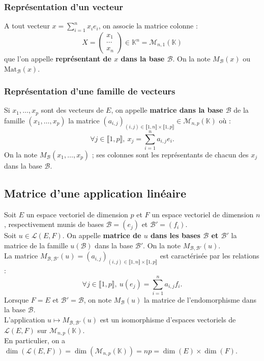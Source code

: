 \documentclass[french]{article}
\newcommand{\K}{\mathbb{K}}
\theoremstyle{plain}
\theoremstyle{definition}
\theoremstyle{remark}
\begin{document}
\subsubsection*{Représentation d'un vecteur}

A tout vecteur $x=\displaystyle\sum_{i=1}^n x_ie_i$, on associe la matrice colonne :
$$X=\begin{pmatrix}
	x_1\\
	\cdots\\
	x_n
\end{pmatrix}\in\K^n=\mathcal{M}_{n,1}(\K)$$ que l'on appelle \textbf{représentant de $x$ dans la base $\mathcal{B}$}. On la note $M_\mathcal{B}(x)$ ou $\text{Mat}_\mathcal{B}(x)$.

\subsubsection*{Représentation d'une famille de vecteurs}

Si $x_1,\ldots,x_p$ sont des vecteurs de $E$, on appelle \textbf{matrice dans la base $\mathcal{B}$} de la famille $(x_1,\ldots,x_p)$ la matrice $(a_{i,j})_{(i,j)\in\llbracket1,n\rrbracket\times\llbracket1,p\rrbracket}\in\mathcal{M}_{n,p}(\K)$ où :
$$\forall j\in\llbracket1,p\rrbracket,\ x_j=\sum_{i=1}^{n}a_{i,j}e_i.$$
On la note $M_\mathcal{B}(x_1,\ldots,x_p)$ ; ses colonnes sont les représentants de chacun des $x_j$ dans la base $\mathcal{B}$.

\subsection{Matrice d'une application linéaire}

Soit $E$ un espace vectoriel de dimension $p$ et $F$ un espace vectoriel de dimension $n$, respectivement munis de bases $\mathcal{B}=(e_j)$ et $\mathcal{B}'=(f_i)$.\\
Soit $u\in\mathcal{L}(E,F)$. On appelle \textbf{matrice de $u$ dans les bases $\mathcal{B}$ et $\mathcal{B}'$} la matrice de la famille $u(\mathcal{B})$ dans la base $\mathcal{B}'$. On la note $M_{\mathcal{B},\mathcal{B}'}(u)$.\\
La matrice $M_{\mathcal{B},\mathcal{B}'}(u)=(a_{i,j})_{(i,j)\in\llbracket1,n\rrbracket\times\llbracket1,p\rrbracket}$ est caractérisée par les relations :
$$\forall j\in\llbracket1,p\rrbracket,\ u(e_j)=\sum_{i=1}^{n}a_{i,j}f_i.$$
Lorsque $F=E$ et $\mathcal{B}'=\mathcal{B}$, on note $M_\mathcal{B}(u)$ la matrice de l'endomorphisme dans la base $\mathcal{B}$.\\
L'application $u\mapsto M_{\mathcal{B},\mathcal{B}'}(u)$ est un isomorphisme d'espaces vectoriels de $\mathcal{L}(E,F)$ sur $\mathcal{M}_{n,p}(\K)$.\\
En particulier, on a $\dim(\mathcal{L}(E,F))=\dim(\mathcal{M}_{n,p}(\K))=np=\dim(E)\times\dim(F)$.
\end{document}
